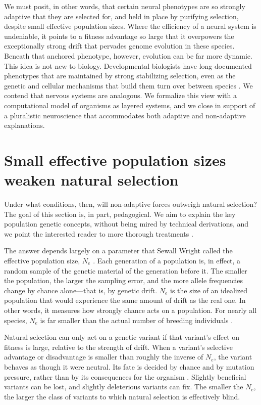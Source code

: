 \documentclass[twocolumn]{article}
\begin{document}
We must posit, in other words, that certain neural phenotypes are so strongly adaptive that they are selected for, and held in place by purifying selection, despite small effective population sizes. Where the efficiency of a neural system is undeniable, it points to a fitness advantage so large that it overpowers the exceptionally strong drift that pervades genome evolution in these species. Beneath that anchored phenotype, however, evolution can be far more dynamic. This idea is not new to biology. Developmental biologists have long documented phenotypes that are maintained by strong stabilizing selection, even as the genetic and cellular mechanisms that build them turn over between species \cite{True_Haag_2001, Parker_Pennell_2025}. We contend that nervous systems are analogous. We formalize this view with a computational model of organisms as layered systems, and we close in support of a pluralistic neuroscience that accommodates both adaptive and non-adaptive explanations.

\section{Small effective population sizes weaken natural selection} \label{sec_popgen}

Under what conditions, then, will non-adaptive forces outweigh natural selection? The goal of this section is, in part, pedagogical. We aim to explain the key population genetic concepts, without being mired by technical derivations, and we point the interested reader to more thorough treatments \cite{Lynch_2007, charlesworth_2009}.

The answer depends largely on a parameter that Sewall Wright called the effective population size, $N_e$ \cite{wright_1931}. Each generation of a population is, in effect, a random sample of the genetic material of the generation before it. The smaller the population, the larger the sampling error, and the more allele frequencies change by chance alone---that is, by genetic drift. $N_e$ is the size of an idealized population that would experience the same amount of drift as the real one. In other words, it measures how strongly chance acts on a population. For nearly all species, $N_e$ is far smaller than the actual number of breeding individuals \cite{crow_newton_1955, frankham_1995, lynch2007origins}.

Natural selection can only act on a genetic variant if that variant's effect on fitness is large, relative to the strength of drift. When a variant's selective advantage or disadvantage is smaller than roughly the inverse of $N_e$, the variant behaves as though it were neutral. Its fate is decided by chance and by mutation pressure, rather than by its consequences for the organism \cite{kimura1983neutral, Lynch_2007, lynch_hagner_2015}. Slightly beneficial variants can be lost, and slightly deleterious variants can fix. The smaller the $N_e$, the larger the class of variants to which natural selection is effectively blind.
\end{document}
